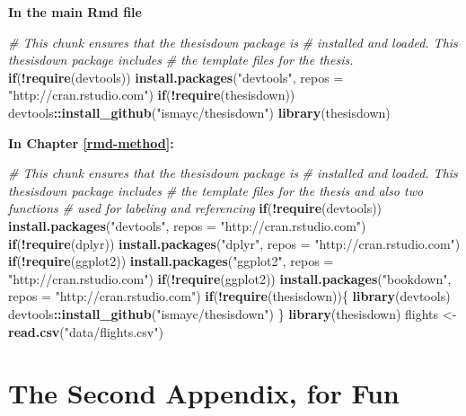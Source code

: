 \documentclass[12pt,twoside]{reedthesis}
\newenvironment{Shaded}{\begin{snugshade}}{\end{snugshade}}
\newcommand{\CommentTok}[1]{\textcolor[rgb]{0.56,0.35,0.01}{\textit{#1}}}
\newcommand{\ControlFlowTok}[1]{\textcolor[rgb]{0.13,0.29,0.53}{\textbf{#1}}}
\newcommand{\DataTypeTok}[1]{\textcolor[rgb]{0.13,0.29,0.53}{#1}}
\newcommand{\KeywordTok}[1]{\textcolor[rgb]{0.13,0.29,0.53}{\textbf{#1}}}
\newcommand{\NormalTok}[1]{#1}
\newcommand{\OperatorTok}[1]{\textcolor[rgb]{0.81,0.36,0.00}{\textbf{#1}}}
\newcommand{\StringTok}[1]{\textcolor[rgb]{0.31,0.60,0.02}{#1}}
\begin{document}
\textbf{In the main Rmd file}
\begin{Shaded}
\begin{Highlighting}[]
\CommentTok{# This chunk ensures that the thesisdown package is}
\CommentTok{# installed and loaded. This thesisdown package includes}
\CommentTok{# the template files for the thesis.}
\ControlFlowTok{if}\NormalTok{(}\OperatorTok{!}\KeywordTok{require}\NormalTok{(devtools))}
  \KeywordTok{install.packages}\NormalTok{(}\StringTok{"devtools"}\NormalTok{, }\DataTypeTok{repos =} \StringTok{"http://cran.rstudio.com"}\NormalTok{)}
\ControlFlowTok{if}\NormalTok{(}\OperatorTok{!}\KeywordTok{require}\NormalTok{(thesisdown))}
\NormalTok{  devtools}\OperatorTok{::}\KeywordTok{install_github}\NormalTok{(}\StringTok{"ismayc/thesisdown"}\NormalTok{)}
\KeywordTok{library}\NormalTok{(thesisdown)}
\end{Highlighting}
\end{Shaded}
\textbf{In Chapter \ref{rmd-method}:}
\begin{Shaded}
\begin{Highlighting}[]
\CommentTok{# This chunk ensures that the thesisdown package is}
\CommentTok{# installed and loaded. This thesisdown package includes}
\CommentTok{# the template files for the thesis and also two functions}
\CommentTok{# used for labeling and referencing}
\ControlFlowTok{if}\NormalTok{(}\OperatorTok{!}\KeywordTok{require}\NormalTok{(devtools))}
  \KeywordTok{install.packages}\NormalTok{(}\StringTok{"devtools"}\NormalTok{, }\DataTypeTok{repos =} \StringTok{"http://cran.rstudio.com"}\NormalTok{)}
\ControlFlowTok{if}\NormalTok{(}\OperatorTok{!}\KeywordTok{require}\NormalTok{(dplyr))}
    \KeywordTok{install.packages}\NormalTok{(}\StringTok{"dplyr"}\NormalTok{, }\DataTypeTok{repos =} \StringTok{"http://cran.rstudio.com"}\NormalTok{)}
\ControlFlowTok{if}\NormalTok{(}\OperatorTok{!}\KeywordTok{require}\NormalTok{(ggplot2))}
    \KeywordTok{install.packages}\NormalTok{(}\StringTok{"ggplot2"}\NormalTok{, }\DataTypeTok{repos =} \StringTok{"http://cran.rstudio.com"}\NormalTok{)}
\ControlFlowTok{if}\NormalTok{(}\OperatorTok{!}\KeywordTok{require}\NormalTok{(ggplot2))}
    \KeywordTok{install.packages}\NormalTok{(}\StringTok{"bookdown"}\NormalTok{, }\DataTypeTok{repos =} \StringTok{"http://cran.rstudio.com"}\NormalTok{)}
\ControlFlowTok{if}\NormalTok{(}\OperatorTok{!}\KeywordTok{require}\NormalTok{(thesisdown))\{}
  \KeywordTok{library}\NormalTok{(devtools)}
\NormalTok{  devtools}\OperatorTok{::}\KeywordTok{install_github}\NormalTok{(}\StringTok{"ismayc/thesisdown"}\NormalTok{)}
\NormalTok{  \}}
\KeywordTok{library}\NormalTok{(thesisdown)}
\NormalTok{flights <-}\StringTok{ }\KeywordTok{read.csv}\NormalTok{(}\StringTok{"data/flights.csv"}\NormalTok{)}
\end{Highlighting}
\end{Shaded}
\hypertarget{the-second-appendix-for-fun}{%
\chapter{The Second Appendix, for Fun}\label{the-second-appendix-for-fun}}
\end{document}
